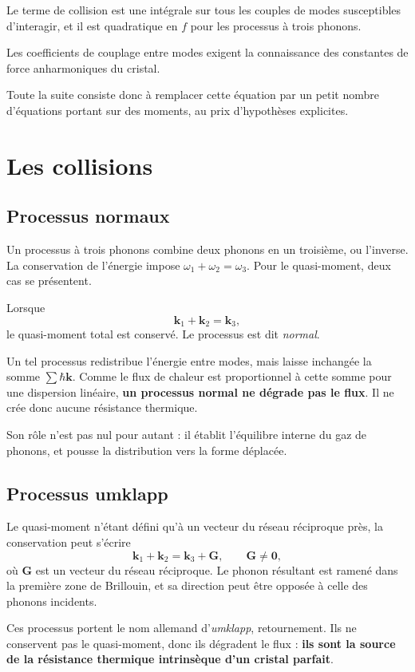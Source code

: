 \documentclass[11pt,a4paper]{article}
\begin{document}
Le terme de collision est une intégrale sur tous les couples de modes susceptibles d'interagir, et
il est quadratique en $f$ pour les processus à trois phonons.

Les coefficients de couplage entre modes exigent la connaissance des constantes de force
anharmoniques du cristal.

Toute la suite consiste donc à remplacer cette équation par un petit nombre d'équations portant sur
des moments, au prix d'hypothèses explicites.

\section{Les collisions}

\subsection{Processus normaux}

Un processus à trois phonons combine deux phonons en un troisième, ou l'inverse. La conservation de
l'énergie impose $\omega_1 + \omega_2 = \omega_3$. Pour le quasi-moment, deux cas se présentent.

Lorsque
\[ \mathbf{k}_1 + \mathbf{k}_2 = \mathbf{k}_3 , \]
le quasi-moment total est conservé. Le processus est dit \emph{normal}.

Un tel processus redistribue l'énergie entre modes, mais laisse inchangée la somme
$\sum \hbar\mathbf{k}$. Comme le flux de chaleur est proportionnel à cette somme pour une dispersion
linéaire, \textbf{un processus normal ne dégrade pas le flux}. Il ne crée donc aucune résistance
thermique.

Son rôle n'est pas nul pour autant : il établit l'équilibre interne du gaz de phonons, et pousse la
distribution vers la forme déplacée.

\subsection{Processus umklapp}

Le quasi-moment n'étant défini qu'à un vecteur du réseau réciproque près, la conservation peut
s'écrire
\[ \mathbf{k}_1 + \mathbf{k}_2 = \mathbf{k}_3 + \mathbf{G} , \qquad \mathbf{G} \neq \mathbf{0} , \]
où $\mathbf{G}$ est un vecteur du réseau réciproque. Le phonon résultant est ramené dans la première
zone de Brillouin, et sa direction peut être opposée à celle des phonons incidents.

Ces processus portent le nom allemand d'\emph{umklapp}, retournement. Ils ne conservent pas le
quasi-moment, donc ils dégradent le flux : \textbf{ils sont la source de la résistance thermique
intrinsèque d'un cristal parfait}.
\end{document}
